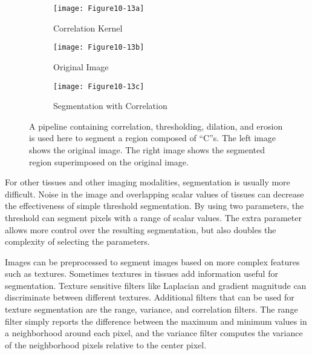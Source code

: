 \begin{figure}[htb]
    \begin{subfigure}[h]{0.16\linewidth}
        \texttt{[image: Figure10-13a]}
        \captionsetup{justification=centering}
        \caption*{Correlation Kernel}
        \label{fig:Figure10-13a}
    \end{subfigure}
    \hfill

    \hfill
    \begin{subfigure}[h]{0.48\linewidth}
        \texttt{[image: Figure10-13b]}
        \captionsetup{justification=centering}
        \caption*{Original Image}
        \label{fig:Figure10-13b}
    \end{subfigure}
    \hfill    
    \begin{subfigure}[h]{0.48\linewidth}
        \texttt{[image: Figure10-13c]}
        \captionsetup{justification=centering}
        \caption*{Segmentation with Correlation}     
        \label{fig:Figure10-13c}
    \end{subfigure}
    \caption{A pipeline containing correlation, thresholding, dilation, and erosion is used here to segment a region composed of ``C''s. The left image shows the original image. The right image shows the segmented region superimposed on the original image.}\label{fig:Figure10-13}
\end{figure}

For other tissues and other imaging modalities, segmentation is usually more difficult. Noise in the image and overlapping scalar values of tissues can decrease the effectiveness of simple threshold segmentation. By using two parameters, the threshold can segment pixels with a range of scalar values. The extra parameter allows more control over the resulting segmentation, but also doubles the complexity of selecting the parameters.

Images can be preprocessed to segment images based on more complex features such as textures. Sometimes textures in tissues add information useful for segmentation. Texture sensitive filters like Laplacian and gradient magnitude can discriminate between different textures. Additional filters that can be used for texture segmentation are the range, variance, and correlation filters. The range filter simply reports the difference between the maximum and minimum values in a neighborhood around each pixel, and the variance filter computes the variance of the neighborhood pixels relative to the center pixel.

